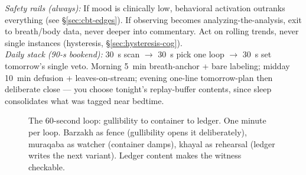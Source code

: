 \begin{center}
{\begin{minipage}{0.92\textwidth}
\textit{Safety rails (always):} If mood is clinically low, behavioral activation outranks everything (see \S\ref{sec:cbt-edges}). If observing becomes analyzing-the-analysis, exit to breath/body data, never deeper into commentary. Act on rolling trends, never single instances (hysteresis, \S\ref{sec:hysteresis-cog}).\\[4pt]
\textit{Daily stack (90-s bookend):} 30~s scan $\to$ 30~s pick one loop $\to$ 30~s set tomorrow's single veto. Morning 5~min breath-anchor + bare labeling; midday 10~min defusion + leaves-on-stream; evening one-line tomorrow-plan then deliberate close --- you choose tonight's replay-buffer contents, since sleep consolidates what was tagged near bedtime.
\end{minipage}%
}
\end{center}

\begin{figure}[h]
\centering
{}
\caption{The 60-second loop: gullibility to container to ledger. One minute per loop. Barzakh as fence (gullibility opens it deliberately), muraqaba as watcher (container damps), khayal as rehearsal (ledger writes the next variant). Ledger content makes the witness checkable.}
\label{fig:gullibility-ch8}
\end{figure}

